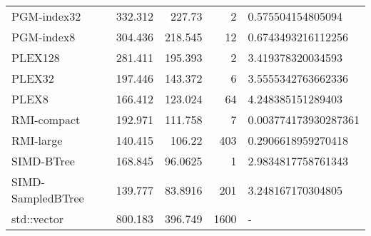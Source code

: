 \begin{tabular}{lrrrl}
 PGM-index32       &                332.312 &              227.73   &            2 & 0.575504154805094    \\
 PGM-index8        &                304.436 &              218.545  &           12 & 0.6743493216112256   \\
 PLEX128           &                281.411 &              195.393  &            2 & 3.419378320034593    \\
 PLEX32            &                197.446 &              143.372  &            6 & 3.5555342763662336   \\
 PLEX8             &                166.412 &              123.024  &           64 & 4.248385151289403    \\
 RMI-compact       &                192.971 &              111.758  &            7 & 0.003774173930287361 \\
 RMI-large         &                140.415 &              106.22   &          403 & 0.2906618959270418   \\
 SIMD-BTree        &                168.845 &               96.0625 &            1 & 2.9834817758761343   \\
 SIMD-SampledBTree &                139.777 &               83.8916 &          201 & 3.248167170304805    \\
 std::vector       &                800.183 &              396.749  &         1600 & -                    \\
\hline
\end{tabular}
